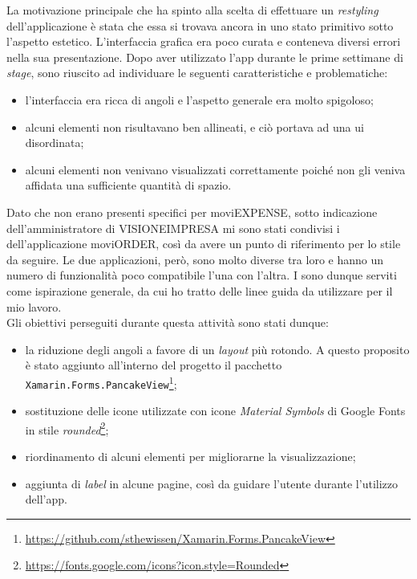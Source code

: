 La motivazione principale che ha spinto alla scelta di effettuare un \textit{restyling} dell'applicazione è stata che essa si trovava ancora in uno stato primitivo sotto l'aspetto estetico. L'interfaccia grafica era poco curata e conteneva diversi errori nella sua presentazione. Dopo aver utilizzato l'app durante le prime settimane di \textit{stage}, sono riuscito ad individuare le seguenti caratteristiche e problematiche:
\begin{itemize}
    \item l'interfaccia era ricca di angoli e l'aspetto generale era molto spigoloso;
    \item alcuni elementi non risultavano ben allineati, e ciò portava ad una \acrshort{ui} disordinata;
    \item alcuni elementi non venivano visualizzati correttamente poiché non gli veniva affidata una sufficiente quantità di spazio.
\end{itemize}

\noindent Dato che non erano presenti \textit{} specifici per moviEXPENSE, sotto indicazione dell'amministratore di VISIONEIMPRESA mi sono stati condivisi i \textit{} dell'applicazione moviORDER, così da avere un punto di riferimento per lo stile da seguire. Le due applicazioni, però, sono molto diverse tra loro e hanno un numero di funzionalità poco compatibile l'una con l'altra. I \textit{} sono dunque serviti come ispirazione generale, da cui ho tratto delle linee guida da utilizzare per il mio lavoro.\\
Gli obiettivi perseguiti durante questa attività sono stati dunque:
\begin{itemize}
    \item la riduzione degli angoli a favore di un \textit{layout} più rotondo. A questo proposito è stato aggiunto all'interno del progetto il pacchetto \texttt{Xamarin.Forms.PancakeView}\footnote{\url{https://github.com/sthewissen/Xamarin.Forms.PancakeView}};
    \item sostituzione delle icone utilizzate con icone \textit{Material Symbols} di Google Fonts in stile \textit{rounded}\footnote{\url{https://fonts.google.com/icons?icon.style=Rounded}};
    \item riordinamento di alcuni elementi per migliorarne la visualizzazione;
    \item aggiunta di \textit{label} in alcune pagine, così da guidare l'utente durante l'utilizzo dell'app.
\end{itemize}

